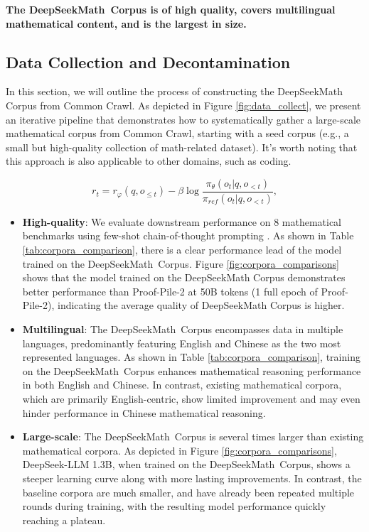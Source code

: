 \begin{itemize}[topsep=0pt]
\textbf{The DeepSeekMath~Corpus is of high quality, covers multilingual mathematical content, and is the largest in size.}

\subsection{Data Collection and Decontamination} In this section, we will outline the process of constructing the DeepSeekMath Corpus from Common Crawl. As depicted in Figure \ref{fig:data_collect}, we present an iterative pipeline that demonstrates how to systematically gather a large-scale mathematical corpus from Common Crawl, starting with a seed corpus (e.g., a small but high-quality collection of math-related dataset). It's worth noting that this approach is also applicable to other domains, such as coding.

\begin{equation}
    r_{t} = r_\varphi(q, o_{\le t}) - \beta \log\frac{\pi_{\theta}(o_{t}|q, o_{<t})}{\pi_{ref}(o_{t}|q, o_{<t})},
\label{eq:PPO-reward}
\end{equation}

\begin{itemize}[topsep=0pt]
    \item \textbf{High-quality}:
    We evaluate downstream performance on 8 mathematical benchmarks using few-shot chain-of-thought prompting \cite{cot}. As shown in Table \ref{tab:corpora_comparison}, there is a clear performance lead of the model trained on the DeepSeekMath~Corpus. Figure \ref{fig:corpora_comparisons} shows that the model trained on the DeepSeekMath Corpus demonstrates better performance than Proof-Pile-2 at 50B tokens (1 full epoch of Proof-Pile-2), indicating the average quality of DeepSeekMath Corpus is higher. 
    \item \textbf{Multilingual}:
    The DeepSeekMath~Corpus encompasses data in multiple languages, predominantly featuring English and Chinese as the two most represented languages. As shown in Table \ref{tab:corpora_comparison}, training on the DeepSeekMath~Corpus enhances mathematical reasoning performance in both English and Chinese. In contrast, existing mathematical corpora, which are primarily English-centric, show limited improvement and may even hinder performance in Chinese mathematical reasoning.
    \item \textbf{Large-scale}:
    The DeepSeekMath~Corpus is several times larger than existing mathematical corpora. As depicted in Figure \ref{fig:corpora_comparisons}, DeepSeek-LLM 1.3B, when trained on the DeepSeekMath~Corpus, shows a steeper learning curve along with more lasting improvements. In contrast, the baseline corpora are much smaller, and have already been repeated multiple rounds during training, with the resulting model performance quickly reaching a plateau.
\end{itemize}


\end{itemize}
